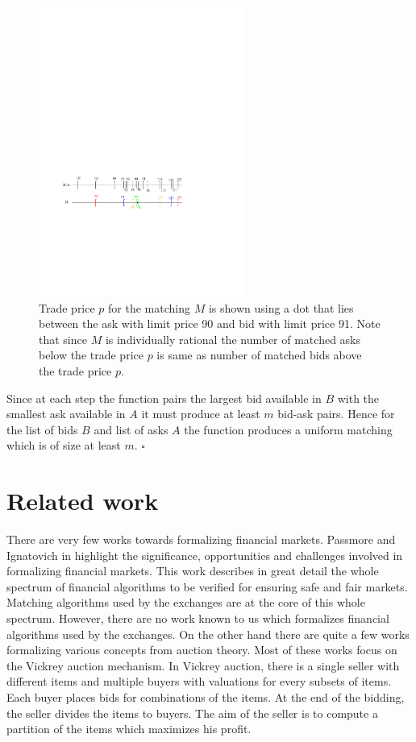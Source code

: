 \documentclass[a4paper,UKenglish,cleveref, autoref]{lipics-v2019}
\begin{document}
\begin{figure}[h!]
\centering
\includegraphics[width=0.6\textwidth]{UM_matching.pdf}
\caption{ Trade price $p$ for the matching $M$ is shown using a dot that lies between the ask with limit price 90 and bid with limit price 91. Note that since $M$ is individually rational the number of matched asks below the trade price $p$ is same as number of matched bids above the trade price $p$. }
\label{fig:UM_match}
\end{figure}

Since at each step the function   pairs the largest bid available in $B$ with the smallest ask available in $A$ it must produce  at least $m$ bid-ask pairs. Hence for the list of bids $B$ and list of asks $A$ the function  produces a uniform matching which is of size at least $m$. $\square$



\section{Related work}\label{sec:related}
There are very few works towards formalizing financial markets. Passmore and Ignatovich in \cite{PassmoreI17} highlight the significance, opportunities and challenges involved in formalizing financial markets. This work describes in great detail the whole spectrum of financial algorithms to be verified for ensuring safe and fair markets. Matching algorithms used by the exchanges are at the core of this whole spectrum. However, there are no work known to us which formalizes financial algorithms used by the exchanges. On the other hand there are quite a few works \cite{toolbox,lange,frank} formalizing various concepts from auction theory. Most of these works focus on the Vickrey auction mechanism. In Vickrey auction, there is a single seller with different items and multiple buyers with valuations for every subsets of items. Each buyer places bids for combinations of the items. At the end of the bidding, the seller divides the items to buyers. The aim of the seller is to compute a partition of the items which maximizes his profit.
\end{document}
